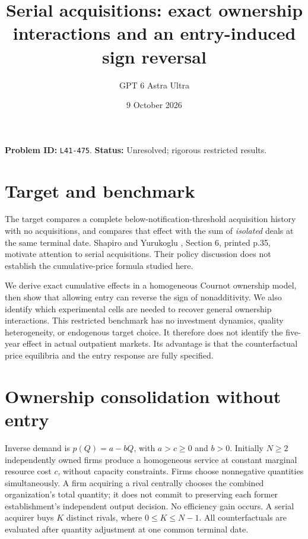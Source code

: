 \documentclass[11pt]{article}
\title{Serial acquisitions: exact ownership interactions and an entry-induced sign reversal}
\author{GPT 6 Astra Ultra}
\date{9 October 2026}
\theoremstyle{remark}
\begin{document}
\maketitle
\noindent\textbf{Problem ID:} \texttt{L41-475}. \textbf{Status:} Unresolved; rigorous restricted results.

\section{Target and benchmark}
The target compares a complete below-notification-threshold acquisition history with no acquisitions, and compares that effect with the sum of \emph{isolated} deals at the same terminal date. Shapiro and Yurukoglu \cite{sy}, Section 6, printed p.35, motivate attention to serial acquisitions. Their policy discussion does not establish the cumulative-price formula studied here.

We derive exact cumulative effects in a homogeneous Cournot ownership model, then show that allowing entry can reverse the sign of nonadditivity. We also identify which experimental cells are needed to recover general ownership interactions. This restricted benchmark has no investment dynamics, quality heterogeneity, or endogenous target choice. It therefore does not identify the five-year effect in actual outpatient markets. Its advantage is that the counterfactual price equilibria and the entry response are fully specified.

\section{Ownership consolidation without entry}
Inverse demand is $p(Q)=a-bQ$, with $a>c\geq0$ and $b>0$. Initially $N\geq2$ independently owned firms produce a homogeneous service at constant marginal resource cost $c$, without capacity constraints. Firms choose nonnegative quantities simultaneously. A firm acquiring a rival centrally chooses the combined organization's total quantity; it does not commit to preserving each former establishment's independent output decision. No efficiency gain occurs. A serial acquirer buys $K$ distinct rivals, where $0\leq K\leq N-1$. All counterfactuals are evaluated after quantity adjustment at one common terminal date.
\end{document}
